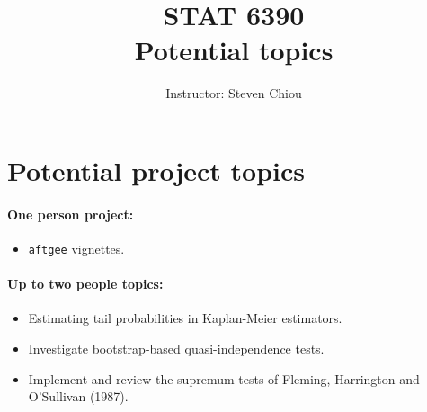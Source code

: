 \documentclass[a4paper,10pt]{article}
\title{STAT 6390\\Potential topics}
\author{Instructor: Steven Chiou }
\date{}
\begin{document}
\maketitle
\section*{Potential project topics}
\paragraph{One person project:}
\begin{itemize}
\item \texttt{aftgee} vignettes.
\end{itemize}
\paragraph{Up to two people topics:}
\begin{itemize}
\item Estimating tail probabilities in Kaplan-Meier estimators.
\item Investigate bootstrap-based quasi-independence tests. 
\item Implement and review the supremum tests of Fleming, Harrington and O'Sullivan (1987).
\end{itemize}
\end{document}
